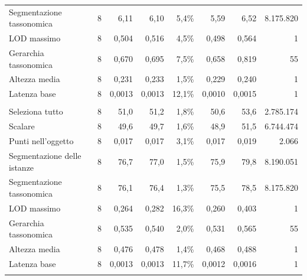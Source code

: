 \begin{small}
\begin{longtable}{lrrrrrr r}
\quad Segmentazione tassonomica & 8 & 6,11 & 6,10 & 5,4\% & 5,59 & 6,52 & 8.175.820 \\
\quad LOD massimo & 8 & 0,504 & 0,516 & 4,5\% & 0,498 & 0,564 & 1 \\
\quad Gerarchia tassonomica & 8 & 0,670 & 0,695 & 7,5\% & 0,658 & 0,819 & 55 \\
\quad Altezza media & 8 & 0,231 & 0,233 & 1,5\% & 0,229 & 0,240 & 1 \\
\quad Latenza base & 8 & 0,0013 & 0,0013 & 12,1\% & 0,0010 & 0,0015 & 1 \\
\addlinespace
\multicolumn{8}{l}{\textbf{Virtuoso}}\\
\quad Seleziona tutto & 8 & 51,0 & 51,2 & 1,8\% & 50,6 & 53,6 & 2.785.174 \\
\quad Scalare & 8 & 49,6 & 49,7 & 1,6\% & 48,9 & 51,5 & 6.744.474 \\
\quad Punti nell'oggetto & 8 & 0,017 & 0,017 & 3,1\% & 0,017 & 0,019 & 2.066 \\
\quad Segmentazione delle istanze & 8 & 76,7 & 77,0 & 1,5\% & 75,9 & 79,8 & 8.190.051 \\
\quad Segmentazione tassonomica & 8 & 76,1 & 76,4 & 1,3\% & 75,5 & 78,5 & 8.175.820 \\
\quad LOD massimo & 8 & 0,264 & 0,282 & 16,3\% & 0,260 & 0,403 & 1 \\
\quad Gerarchia tassonomica & 8 & 0,535 & 0,540 & 2,0\% & 0,531 & 0,565 & 55 \\
\quad Altezza media & 8 & 0,476 & 0,478 & 1,4\% & 0,468 & 0,488 & 1 \\
\quad Latenza base & 8 & 0,0013 & 0,0013 & 11,7\% & 0,0012 & 0,0016 & 1 \\
\addlinespace
\end{longtable}
\end{small}


